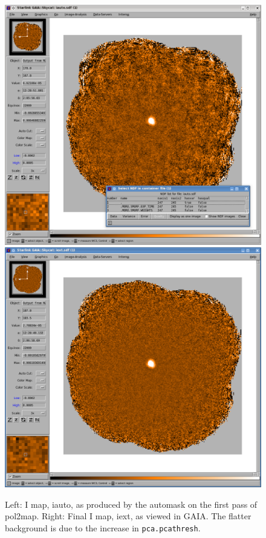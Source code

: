 \begin{figure}[t!]
\begin{center}
\includegraphics[width=0.46\linewidth]{sc22-gaia-view-iauto.png}
\includegraphics[width=0.46\linewidth]{sc22-gaia-view-iext.png}
\label{fig:gaia-iext}
\caption [Final I map in GAIA]{
  \small Left: I map, iauto, as produced by the automask on the first pass of pol2map. Right: Final I map, iext, as viewed in GAIA.
         The flatter background is due to the increase in \texttt{pca.pcathresh}.
}
\end{center}
\end{figure}


